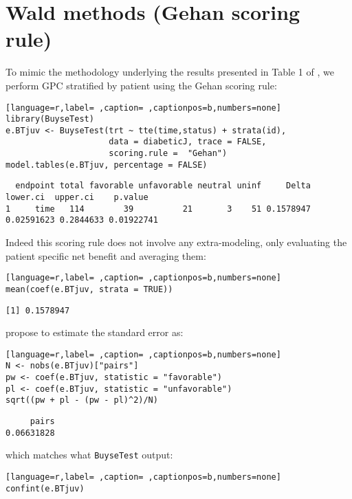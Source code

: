 \documentclass[12pt]{article}
\begin{document}
\clearpage

\section{Wald methods (Gehan scoring rule)}
\label{sec:org8fd5760}

To mimic the methodology underlying the results presented in Table 1
of \cite{matsouaka2022robust}, we perform GPC stratified by patient
using the Gehan scoring rule:
\begin{lstlisting}[language=r,label= ,caption= ,captionpos=b,numbers=none]
library(BuyseTest)
e.BTjuv <- BuyseTest(trt ~ tte(time,status) + strata(id), 
                     data = diabeticJ, trace = FALSE,
                     scoring.rule =  "Gehan")
model.tables(e.BTjuv, percentage = FALSE)
\end{lstlisting}

\begin{verbatim}
  endpoint total favorable unfavorable neutral uninf     Delta   lower.ci  upper.ci    p.value
1     time   114        39          21       3    51 0.1578947 0.02591623 0.2844633 0.01922741
\end{verbatim}


Indeed this scoring rule does not involve any extra-modeling, only
evaluating the patient specific net benefit and averaging them:
\begin{lstlisting}[language=r,label= ,caption= ,captionpos=b,numbers=none]
mean(coef(e.BTjuv, strata = TRUE))
\end{lstlisting}

\begin{verbatim}
[1] 0.1578947
\end{verbatim}


\cite{matsouaka2022robust} propose to estimate the standard error as:
\begin{lstlisting}[language=r,label= ,caption= ,captionpos=b,numbers=none]
N <- nobs(e.BTjuv)["pairs"]
pw <- coef(e.BTjuv, statistic = "favorable")
pl <- coef(e.BTjuv, statistic = "unfavorable")
sqrt((pw + pl - (pw - pl)^2)/N)
\end{lstlisting}

\begin{verbatim}
     pairs 
0.06631828
\end{verbatim}


which matches what \texttt{BuyseTest} output:
\begin{lstlisting}[language=r,label= ,caption= ,captionpos=b,numbers=none]
confint(e.BTjuv)
\end{lstlisting}
\end{document}
